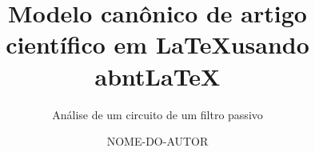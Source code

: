 \documentclass[oneside]{abntlatex}
\title        {Modelo canônico de artigo científico em \LaTeX usando abnt\LaTeX}
\subtitle     {Análise de um circuito de um filtro passivo}
\author       {NOME-DO-AUTOR}
\date         {\the\year}
\begin{document}
  \pretext%
  \maketitle %

  \coverpage%
  \begin{abstract}%
    \lipsum[1-1]
  \end{abstract}
  \listoffigures%
  \listoftables%
  \tableofcontents%

  \maintext%

  

  

  

  \backtext%
\end{document}
